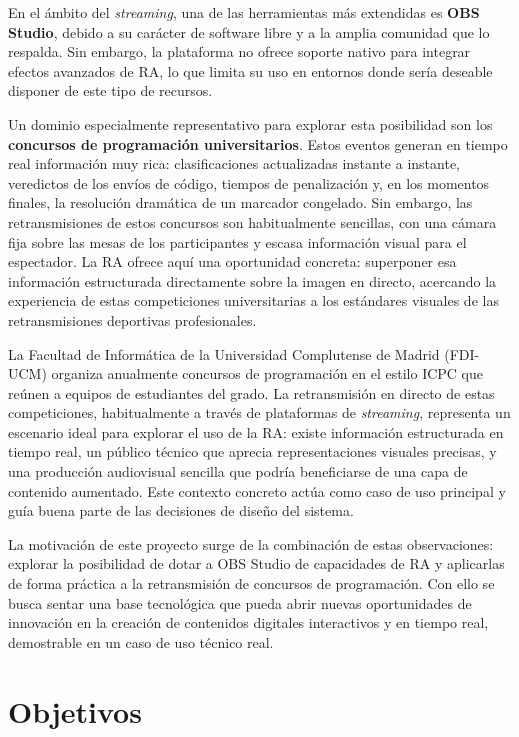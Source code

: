 En el ámbito del \textit{streaming}, una de las herramientas más extendidas es \textbf{OBS Studio}, debido a su carácter de software libre y a la amplia comunidad que lo respalda. Sin embargo, la plataforma no ofrece soporte nativo para integrar efectos avanzados de RA, lo que limita su uso en entornos donde sería deseable disponer de este tipo de recursos.

Un dominio especialmente representativo para explorar esta posibilidad son los \textbf{concursos de programación universitarios}. Estos eventos generan en tiempo real información muy rica: clasificaciones actualizadas instante a instante, veredictos de los envíos de código, tiempos de penalización y, en los momentos finales, la resolución dramática de un marcador congelado. Sin embargo, las retransmisiones de estos concursos son habitualmente sencillas, con una cámara fija sobre las mesas de los participantes y escasa información visual para el espectador. La RA ofrece aquí una oportunidad concreta: superponer esa información estructurada directamente sobre la imagen en directo, acercando la experiencia de estas competiciones universitarias a los estándares visuales de las retransmisiones deportivas profesionales.

La Facultad de Informática de la Universidad Complutense de Madrid (FDI-UCM) organiza anualmente concursos de programación en el estilo ICPC que reúnen a equipos de estudiantes del grado. La retransmisión en directo de estas competiciones, habitualmente a través de plataformas de \textit{streaming}, representa un escenario ideal para explorar el uso de la RA: existe información estructurada en tiempo real, un público técnico que aprecia representaciones visuales precisas, y una producción audiovisual sencilla que podría beneficiarse de una capa de contenido aumentado. Este contexto concreto actúa como caso de uso principal y guía buena parte de las decisiones de diseño del sistema.

La motivación de este proyecto surge de la combinación de estas observaciones: explorar la posibilidad de dotar a OBS Studio de capacidades de RA y aplicarlas de forma práctica a la retransmisión de concursos de programación. Con ello se busca sentar una base tecnológica que pueda abrir nuevas oportunidades de innovación en la creación de contenidos digitales interactivos y en tiempo real, demostrable en un caso de uso técnico real.

\section{Objetivos}

